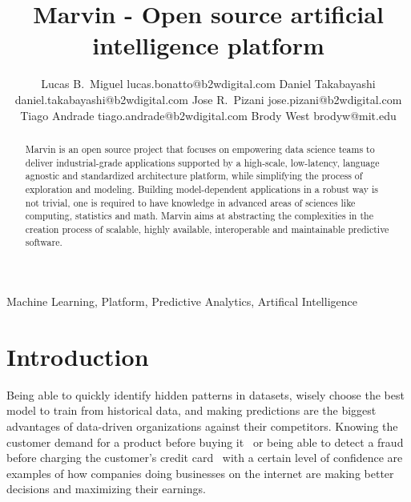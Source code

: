 \documentclass[twoside,11pt]{article}
\begin{document}
\title{Marvin - Open source artificial intelligence platform}

\author{\name Lucas B.\ Miguel \email lucas.bonatto@b2wdigital.com
       \AND
        \name Daniel Takabayashi \email daniel.takabayashi@b2wdigital.com
       \AND
       \name Jose R.\ Pizani \email jose.pizani@b2wdigital.com
       \AND
       \name Tiago Andrade \email tiago.andrade@b2wdigital.com
       \AND
       \name Brody West \email brodyw@mit.edu \\
       }


\maketitle

\begin{abstract}%
Marvin is an open source project that focuses on empowering data science teams to deliver industrial-grade applications supported by a high-scale, low-latency, language agnostic and standardized architecture platform, while simplifying the process of exploration and modeling. Building model-dependent applications in a robust way is not trivial, one is required to have knowledge in advanced areas of sciences like computing, statistics and math. Marvin aims at abstracting the complexities in the creation process of scalable, highly available, interoperable and maintainable predictive software.
\end{abstract}

\begin{keywords}
  Machine Learning, Platform, Predictive Analytics, Artifical Intelligence
\end{keywords}

\section{Introduction}

Being able to quickly identify hidden patterns in datasets, wisely choose the best model to train from historical data, and making predictions are the biggest advantages of data-driven organizations against their competitors. Knowing the customer demand for a product before buying it~\citep{chen2000quantifying} or being able to detect a fraud before charging the customer's credit card~\citep{chan1998toward} with a certain level of confidence are examples of how companies doing businesses on the internet are making better decisions and maximizing their earnings.
\end{document}

